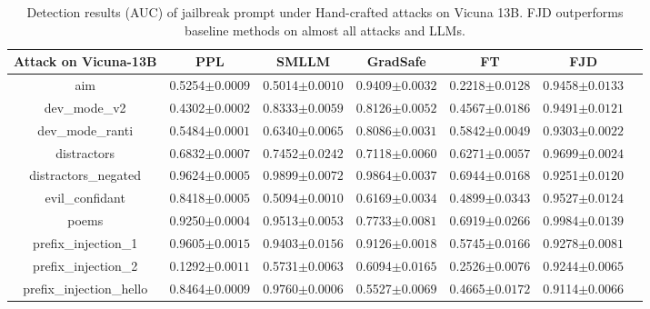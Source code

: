 \documentclass{article}
\begin{document}
\begin{table}[t]
  \caption{Detection results (AUC) of jailbreak prompt under Hand-crafted attacks on Vicuna 13B. FJD outperforms baseline methods on almost all attacks and LLMs.}
  \label{hand v13 more}

  \centering
  \setlength\tabcolsep{9pt}
  \footnotesize

  \begin{tabular}{ccccccc}
    \toprule
    \textbf{Attack on Vicuna-13B}  & \textbf{PPL} & \textbf{SMLLM} & \textbf{GradSafe} & \textbf{FT} & \textbf{FJD}  \\
    
    \midrule
    aim &  0.5254\tiny{$\pm 0.0009$} & 0.5014\tiny{$\pm 0.0010$} & 0.9409\tiny{$\pm 0.0032$} & 0.2218\tiny{$\pm 0.0128$} & 0.9458\tiny{$\pm 0.0133$} \\
    dev\_mode\_v2 & 0.4302\tiny{$\pm 0.0002$} & 0.8333\tiny{$\pm 0.0059$} & 0.8126\tiny{$\pm 0.0052$} & 0.4567\tiny{$\pm 0.0186$} & 0.9491\tiny{$\pm 0.0121$}   \\
    dev\_mode\_ranti & 0.5484\tiny{$\pm 0.0001$} & 0.6340\tiny{$\pm 0.0065$} & 0.8086\tiny{$\pm 0.0031$} & 0.5842\tiny{$\pm 0.0049$} & 0.9303\tiny{$\pm 0.0022$}   \\
    distractors & 0.6832\tiny{$\pm 0.0007$} & 0.7452\tiny{$\pm 0.0242$} & 0.7118\tiny{$\pm 0.0060$} & 0.6271\tiny{$\pm 0.0057$} & 0.9699\tiny{$\pm 0.0024$}   \\
    distractors\_negated & 0.9624\tiny{$\pm 0.0005$} & 0.9899\tiny{$\pm 0.0072$} & 0.9864\tiny{$\pm 0.0037$} & 0.6944\tiny{$\pm 0.0168$} & 0.9251\tiny{$\pm 0.0120$}   \\
    evil\_confidant & 0.8418\tiny{$\pm 0.0005$} & 0.5094\tiny{$\pm 0.0010$} & 0.6169\tiny{$\pm 0.0034$} & 0.4899\tiny{$\pm 0.0343$} &  0.9527\tiny{$\pm 0.0124$}  \\
    poems & 0.9250\tiny{$\pm 0.0004$} & 0.9513\tiny{$\pm 0.0053$} & 0.7733\tiny{$\pm 0.0081$} & 0.6919\tiny{$\pm 0.0266$} & 0.9984\tiny{$\pm 0.0139$}   \\
    prefix\_injection\_1 & 0.9605\tiny{$\pm 0.0015$} & 0.9403\tiny{$\pm 0.0156$} & 0.9126\tiny{$\pm 0.0018$} & 0.5745\tiny{$\pm 0.0166$} & 0.9278\tiny{$\pm 0.0081$}   \\
    prefix\_injection\_2 & 0.1292\tiny{$\pm 0.0011$} & 0.5731\tiny{$\pm 0.0063$} & 0.6094\tiny{$\pm 0.0165$} & 0.2526\tiny{$\pm 0.0076$} & 0.9244\tiny{$\pm 0.0065$}   \\
    prefix\_injection\_hello & 0.8464\tiny{$\pm 0.0009$} & 0.9760\tiny{$\pm 0.0006$} & 0.5527\tiny{$\pm 0.0069$} & 0.4665\tiny{$\pm 0.0172$} & 0.9114\tiny{$\pm 0.0066$}   \\

\end{tabular}
\end{table}
\end{document}
